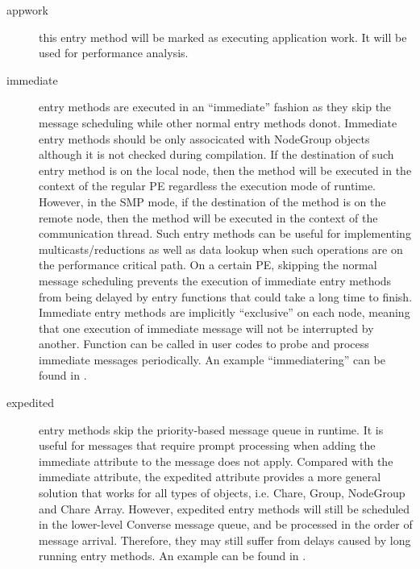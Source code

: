 \begin{description}
\item[appwork] this entry method will be marked as executing application work. It will be used for performance analysis.

\item[immediate] entry methods are executed in an
``immediate'' fashion as they skip the message scheduling while other normal
entry methods donot. Immediate entry methods should be only associcated with
NodeGroup objects although it is not checked during compilation. If the
destination of such entry method is on the local node, then the method will be
executed in the context of the regular PE regardless the execution mode of
\charmpp{} runtime. However, in the SMP mode, if the destination of the method
is on the remote node, then the method will be executed in the context of the
communication thread.  
Such entry methods can be useful for implementing multicasts/reductions as well
as data lookup when such operations are on the performance critical path. On a
certain \charmpp{} PE, skipping the normal message scheduling prevents the
execution of immediate entry methods from being delayed by entry functions that
could take a long time to finish. Immediate entry methods are implicitly
``exclusive'' on each node, meaning that one execution of immediate message
will not be interrupted by another. Function  can be
called in user codes to probe and process immediate messages periodically. An
example ``immediatering'' can be found in .

\item[expedited] entry methods skip the priority-based message
queue in \charmpp{} runtime. It is useful for messages that require prompt
processing when adding the immediate attribute to the message does not apply.
Compared with the immediate attribute, the expedited attribute provides a more
general solution that works for all types of \charmpp{} objects, i.e. Chare,
Group, NodeGroup and Chare Array. However, expedited entry methods will still
be scheduled in the lower-level Converse message queue, and be processed in the
order of message arrival. Therefore, they may still suffer from delays caused
by long running entry methods. An example can be found in 
.


\end{description}
